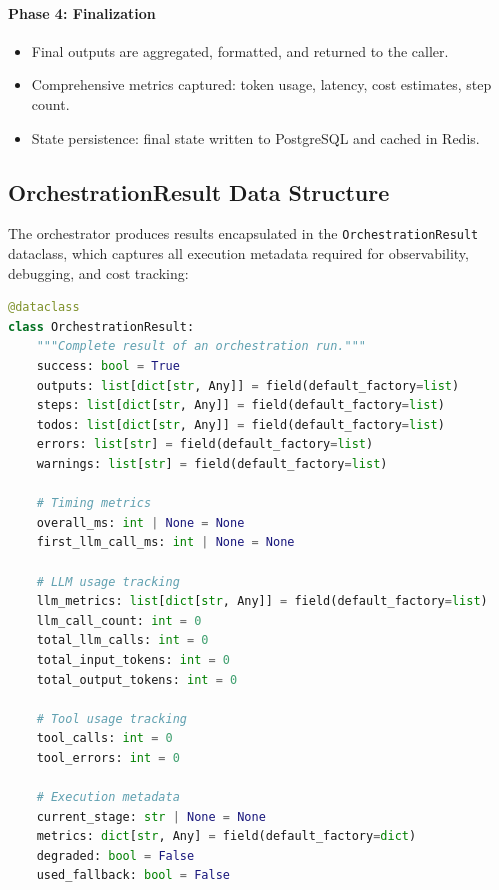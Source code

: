 \documentclass[a4paper,twoside]{sapthesis}
\begin{document}
\paragraph{Phase 4: Finalization}
\begin{itemize}
    \item Final outputs are aggregated, formatted, and returned to the caller.
    \item Comprehensive metrics captured: token usage, latency, cost estimates, step count.
    \item State persistence: final state written to PostgreSQL and cached in Redis.
\end{itemize}

\subsection{OrchestrationResult Data Structure}

The orchestrator produces results encapsulated in the \texttt{OrchestrationResult} dataclass, which captures all execution metadata required for observability, debugging, and cost tracking:

\begin{lstlisting}[language=Python, caption={OrchestrationResult dataclass structure}, label=lst:orchestration-result]
@dataclass
class OrchestrationResult:
    """Complete result of an orchestration run."""
    success: bool = True
    outputs: list[dict[str, Any]] = field(default_factory=list)
    steps: list[dict[str, Any]] = field(default_factory=list)
    todos: list[dict[str, Any]] = field(default_factory=list)
    errors: list[str] = field(default_factory=list)
    warnings: list[str] = field(default_factory=list)
    
    # Timing metrics
    overall_ms: int | None = None
    first_llm_call_ms: int | None = None
    
    # LLM usage tracking
    llm_metrics: list[dict[str, Any]] = field(default_factory=list)
    llm_call_count: int = 0
    total_llm_calls: int = 0
    total_input_tokens: int = 0
    total_output_tokens: int = 0
    
    # Tool usage tracking
    tool_calls: int = 0
    tool_errors: int = 0
    
    # Execution metadata
    current_stage: str | None = None
    metrics: dict[str, Any] = field(default_factory=dict)
    degraded: bool = False
    used_fallback: bool = False
\end{lstlisting}
\end{document}
